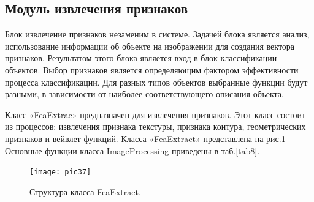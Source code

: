 \documentclass[a4paper,14pt]{extreport}
\begin{document}
\subsection{Модуль извлечения признаков}
Блок извлечение признаков незаменим в системе. Задачей блока является анализ, использование информации об объекте на изображении для создания вектора признаков. Результатом этого блока является вход в блок классификации объектов. Выбор признаков является определяющим фактором эффективности процесса классификации. Для разных типов объектов выбранные функции будут разными, в зависимости от наиболее соответствующего описания объекта.

Класс «FeaExtrac» предназначен для извлечения признаков. Этот класс состоит из процессов: извлечения признака текстуры, признака контура, геометрических признаков и вейвлет-функций. Класса «FeaExtract» представлена на рис.\ref{pic37} Основные функции класса ImageProcessing приведены в таб.\ref{tab8}.
\begin{figure}[ht!]
\centering
\texttt{[image: pic37]}
\caption{Структура класса FeaExtract.}
	\label{pic37}
		\end{figure}
	
\end{document}
